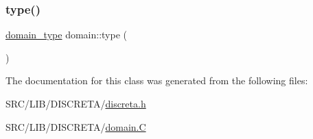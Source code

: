\mbox{\label{classdomain_ade7477ca71058c5f20a02f31c9639863}} 
\subsubsection{\texorpdfstring{type()}{type()}}
{\footnotesize\ttfamily \mbox{\hyperlink{discreta_8h_a3fcb7d3694a4550768d8b965fefd32eb}{domain\+\_\+type}} domain\+::type (\begin{DoxyParamCaption}{ }\end{DoxyParamCaption})}



The documentation for this class was generated from the following files\+:\begin{DoxyCompactItemize}
\item 
S\+R\+C/\+L\+I\+B/\+D\+I\+S\+C\+R\+E\+T\+A/\mbox{\hyperlink{discreta_8h}{discreta.\+h}}\item 
S\+R\+C/\+L\+I\+B/\+D\+I\+S\+C\+R\+E\+T\+A/\mbox{\hyperlink{domain_8_c}{domain.\+C}}\end{DoxyCompactItemize}
